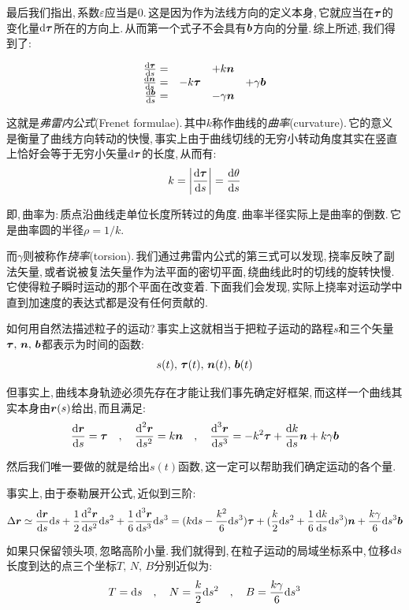 最后我们指出,\,系数$\varepsilon$应当是$0$.\,这是因为作为法线方向的定义本身,\,它就应当在$\boldsymbol{\tau}$的变化量$\textrm{d}\boldsymbol{\tau}$所在的方向上.\,从而第一个式子不会具有$\boldsymbol{b}$方向的分量.\,综上所述,\,我们得到了:

\[\begin{array}{rlll}
\frac{\textrm{d} \boldsymbol{\tau}}{\textrm{d} s}=		&	 	&	+k\boldsymbol{n} 		& \\
\frac{\textrm{d} \boldsymbol{n}}{\textrm{d} s}=		&	-k\boldsymbol{\tau} 	&	 		& +\gamma\boldsymbol{b}\\
\frac{\textrm{d} \boldsymbol{b}}{\textrm{d} s}=		&	 	&	-\gamma\boldsymbol{n} 		& 
\end{array}\]

这就是\emph{弗雷内公式}(Frenet formulae).\,其中$k$称作曲线的\emph{曲率}(curvature).\,它的意义是衡量了曲线方向转动的快慢,\,事实上由于曲线切线的无穷小转动角度其实在竖直上恰好会等于无穷小矢量$\textrm{d}\boldsymbol{\tau}$的长度,\,从而有:
\[k=\left| \frac{\textrm{d}\boldsymbol{\tau}}{\textrm{d} s} \right|=\frac{\textrm{d}\theta}{\textrm{d} s}\]

即,\,曲率为:\,质点沿曲线走单位长度所转过的角度.\,曲率半径实际上是曲率的倒数.\,它是曲率圆的半径$\rho=1/k$.

而$\gamma$则被称作\emph{挠率}(torsion).\,我们通过弗雷内公式的第三式可以发现,\,挠率反映了副法矢量,\,或者说被复法矢量作为法平面的密切平面,\,绕曲线此时的切线的旋转快慢.\,它使得粒子瞬时运动的那个平面在改变着.\,下面我们会发现,\,实际上挠率对运动学中直到加速度的表达式都是没有任何贡献的.

如何用自然法描述粒子的运动?\,事实上这就相当于把粒子运动的路程$s$和三个矢量$\boldsymbol{\tau},\,\boldsymbol{n},\,\boldsymbol{b}$都表示为时间的函数:
\[s(t),\,\boldsymbol{\tau}(t),\,\boldsymbol{n}(t),\,\boldsymbol{b}(t)\]

但事实上,\,曲线本身轨迹必须先存在才能让我们事先确定好框架,\,而这样一个曲线其实本身由$\boldsymbol{r}(s)$给出,\,而且满足:
\[\frac{\textrm{d} \boldsymbol{r}}{\textrm{d} s}=\boldsymbol{\tau}\quad,\quad \frac{\textrm{d}^2 \boldsymbol{r}}{\textrm{d} s^2}=k\boldsymbol{n}\quad,\quad \frac{\textrm{d}^3 \boldsymbol{r}}{\textrm{d} s^3}=-k^2\boldsymbol{\tau}+\frac{\textrm{d} k}{\textrm{d} s}\boldsymbol{n}+k\gamma\boldsymbol{b}\]

然后我们唯一要做的就是给出$s(t)$函数,\,这一定可以帮助我们确定运动的各个量.

事实上,\,由于泰勒展开公式,\,近似到三阶:
\[\Delta \boldsymbol{r}\simeq\frac{\textrm{d} \boldsymbol{r}}{\textrm{d} s}\textrm{d} s+\frac{1}{2}\frac{\textrm{d}^2 \boldsymbol{r}}{\textrm{d} s^2}\textrm{d} s^2+\frac{1}{6}\frac{\textrm{d}^3 \boldsymbol{r}}{\textrm{d} s^3}\textrm{d} s^3=(k\textrm{d} s-\frac{k^2}{6}\textrm{d} s^3)\boldsymbol{\tau}+(\frac{k}{2}\textrm{d} s^2+\frac{1}{6}\frac{\textrm{d} k}{\textrm{d} s}\textrm{d} s^3)\boldsymbol{n}+\frac{k\gamma}{6}\textrm{d} s^3\boldsymbol{b}\]

如果只保留领头项,\,忽略高阶小量.\,我们就得到,\,在粒子运动的局域坐标系中,\,位移$\textrm{d} s$长度到达的点三个坐标$T,\,N,\,B$分别近似为:
\[T=\textrm{d} s \quad,\quad N=\frac{k}{2}\textrm{d} s^2 \quad,\quad B=\frac{k\gamma}{6}\textrm{d} s^3\]

